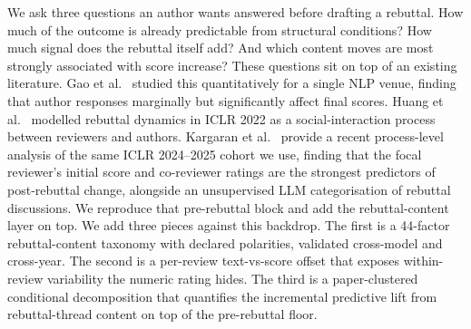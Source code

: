\documentclass{article}
\begin{document}
We ask three questions an author wants answered before drafting a rebuttal. How much of the outcome is already predictable from structural conditions? How much signal does the rebuttal itself add? And which content moves are most strongly associated with score increase? These questions sit on top of an existing literature. Gao et al.~\cite{gao} studied this quantitatively for a single NLP venue, finding that author responses marginally but significantly affect final scores. Huang et al.~\cite{huang} modelled rebuttal dynamics in ICLR 2022 as a social-interaction process between reviewers and authors. Kargaran et al.~\cite{kargaran} provide a recent process-level analysis of the same ICLR 2024--2025 cohort we use, finding that the focal reviewer's initial score and co-reviewer ratings are the strongest predictors of post-rebuttal change, alongside an unsupervised LLM categorisation of rebuttal discussions. We reproduce that pre-rebuttal block and add the rebuttal-content layer on top. We add three pieces against this backdrop. The first is a 44-factor rebuttal-content taxonomy with declared polarities, validated cross-model and cross-year. The second is a per-review text-vs-score offset that exposes within-review variability the numeric rating hides. The third is a paper-clustered conditional decomposition that quantifies the incremental predictive lift from rebuttal-thread content on top of the pre-rebuttal floor.
\end{document}
